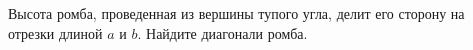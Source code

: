 \begin{ex}
	\begin{condition}
		Высота ромба, проведенная из вершины тупого угла, делит его сторону на отрезки длиной \( a  \) и \( b \). Найдите диагонали ромба.
	\end{condition}
\end{ex}
